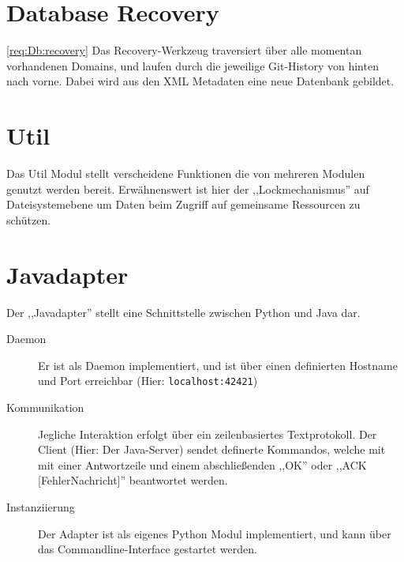 \section{Database Recovery} 
\label{sec:database_recovery}
\ref{req:Db:recovery}
Das Recovery-Werkzeug traversiert über alle momentan vorhandenen Domains, und laufen durch die
jeweilige Git-History von hinten nach vorne. Dabei wird aus den XML Metadaten eine neue Datenbank gebildet.

\section{Util} 
\label{sec:util}
Das Util Modul stellt verscheidene Funktionen die von mehreren Modulen genutzt werden bereit.
Erwähnenswert ist hier der ,,Lockmechanismus''
auf Dateisystemebene um Daten beim Zugriff auf gemeinsame  Ressourcen zu schützen.

\section{Javadapter} 
\label{sec:javadapter}
Der ,,Javadapter'' stellt eine Schnittstelle zwischen Python und Java dar.
\begin{description}
  \item [Daemon] Er ist als Daemon implementiert, und ist über einen
    definierten Hostname und Port erreichbar (Hier: \texttt{localhost:42421})
  \item [Kommunikation] Jegliche Interaktion erfolgt über ein
    zeilenbasiertes Textprotokoll. Der Client (Hier: Der Java-Server)
    sendet definerte Kommandos, welche mit mit einer Antwortzeile
    und einem abschließenden ,,OK'' oder ,,ACK [FehlerNachricht]''
    beantwortet werden.
  \item [Instanziierung] Der Adapter ist als eigenes Python Modul
    implementiert, und kann über das Commandline-Interface gestartet
    werden.
\end{description}
 
